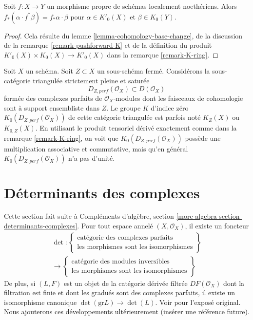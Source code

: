 \begin{lemma}
\label{lemma-projection-formula}
Soit $f : X \to Y$ un morphisme propre de schémas localement noethériens.
Alors $f_*(\alpha \cdot f^*\beta) = f_*\alpha \cdot \beta$
pour $\alpha \in K'_0(X)$ et $\beta \in K_0(Y)$.
\end{lemma}

\begin{proof}
Cela résulte du lemme \ref{lemma-cohomology-base-change}, de la discussion de la
remarque \ref{remark-pushforward-K} et de la définition du produit
$K'_0(X) \times K_0(X) \to K'_0(X)$ dans la remarque \ref{remark-K-ring}.
\end{proof}

\begin{remark}
\label{remark-perf-Z}
Soit $X$ un schéma. Soit $Z \subset X$ un sous-schéma fermé. Considérons la
sous-catégorie triangulée strictement pleine et saturée
$$
D_{Z, perf}(\mathcal{O}_X) \subset D(\mathcal{O}_X)
$$
formée des complexes parfaits de $\mathcal{O}_X$-modules
dont les faisceaux de cohomologie sont à support ensembliste dans $Z$.
Le groupe $K$ d'indice zéro $K_0(D_{Z, perf}(\mathcal{O}_X))$
de cette catégorie triangulée est parfois noté
$K_Z(X)$ ou $K_{0, Z}(X)$. En utilisant le produit tensoriel dérivé exactement
comme dans la remarque \ref{remark-K-ring}, on voit que $K_0(D_{Z, perf}(\mathcal{O}_X))$
possède une multiplication associative et commutative,
mais qu'en général $K_0(D_{Z, perf}(\mathcal{O}_X))$ n'a pas d'unité.
\end{remark}










\section{Déterminants des complexes}
\label{section-det-two-terms}

\noindent
Cette section fait suite à
Compléments d'algèbre, section \ref{more-algebra-section-determinants-complexes}.
Pour tout espace annelé $(X, \mathcal{O}_X)$, il existe un foncteur
$$
\begin{gathered}
\det :
\left\{
\begin{matrix}
\text{catégorie des complexes parfaits} \\
\text{les morphismes sont les isomorphismes}
\end{matrix}
\right\}
\\
\longrightarrow
\left\{
\begin{matrix}
\text{catégorie des modules inversibles} \\
\text{les morphismes sont les isomorphismes}
\end{matrix}
\right\}
\end{gathered}
$$
De plus, si $(L, F)$ est un objet de la catégorie dérivée filtrée
$DF(\mathcal{O}_X)$ dont la filtration est finie et dont les gradués
sont des complexes parfaits, il existe un isomorphisme canonique
$\det(\text{gr}L) \to \det(L)$. Voir \cite{determinant} pour l'exposé
original. Nous ajouterons ces développements ultérieurement (insérer une référence future).

